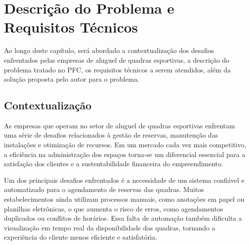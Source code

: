 \chapter{Descrição do Problema e Requisitos Técnicos}\label{cap:descricao_problema_e_requisitos}




Ao longo deste capítulo, será abordado a contextualização dos desafios enfrentados pelas empresas de aluguel de quadras esportivas, a descrição do problema tratado no PFC, os requisitos técnicos a serem atendidos, além da solução proposta pelo autor para o problema.

\section{Contextualização}

As empresas que operam no setor de aluguel de quadras esportivas enfrentam uma série de desafios relacionados à gestão de reservas, manutenção das instalações e otimização de recursos. Em um mercado cada vez mais competitivo, a eficiência na administração dos espaços torna-se um diferencial essencial para a satisfação dos clientes e a sustentabilidade financeira do empreendimento.

Um dos principais desafios enfrentados é a necessidade de um sistema confiável e automatizado para o agendamento de reservas das quadras. Muitos estabelecimentos ainda utilizam processos manuais, como anotações em papel ou planilhas eletrônicas, o que aumenta o risco de erros, como agendamentos duplicados ou conflitos de horários. Essa falta de automação também dificulta a visualização em tempo real da disponibilidade das quadras, tornando a experiência do cliente menos eficiente e satisfatória.

